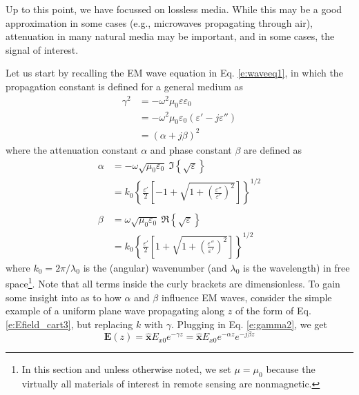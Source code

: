 \documentclass[11pt, oneside]{article}
\begin{document}
Up to this point, we have focussed on lossless media. While this may be a good approximation in some cases (e.g., microwaves propagating through air), attenuation in many natural media may be important, and in some cases, the signal of interest. 

Let us start by recalling the EM wave equation in Eq. \ref{e:waveeq1}, in which the propagation constant is defined for a general medium as
	\begin{subequations}
	\label{e:gamma2}
	\begin{align}
	\gamma^2 &= -\omega^2\mu_0\varepsilon\varepsilon_0 \\
			&= -\omega^2\mu_0\varepsilon_0(\varepsilon' - j\varepsilon'') \\
			&= (\alpha + j\beta)^2
	\end{align}
	\end{subequations}
where the attenuation constant $\alpha$ and phase constant $\beta$ are defined as 
	\begin{subequations}
	\label{e:alphabeta1}
	\begin{align}
	\alpha &= -\omega \sqrt{\mu_0\varepsilon_0}\ \Im{\left\{\sqrt{\varepsilon}\right\}} \nonumber \\
		&= k_0\left\{ \frac{\varepsilon'}{2}\left[-1 + \sqrt{1+\left(\frac{\varepsilon''}{\varepsilon'}\right)^2} \right]\right\}^{1/2} \label{e:alpha1} \\ \nonumber \\ 
	\beta &= \omega\sqrt{\mu_0\varepsilon_0}\ \Re{\left\{\sqrt{\varepsilon}\right\}} \nonumber \\
		&= k_0\left\{ \frac{\varepsilon'}{2}\left[1 + \sqrt{1+\left(\frac{\varepsilon''}{\varepsilon'}\right)^2} \right]\right\}^{1/2} \label{e:beta1}
	\end{align}
	\end{subequations}
where $k_0 = 2\pi/\lambda_0$ is the (angular) wavenumber (and $\lambda_0$ is the wavelength) in free space\footnote{In this section and unless otherwise noted, we set $\mu = \mu_0$ because the virtually all materials of interest in remote sensing are nonmagnetic.}. Note that all terms inside the curly brackets are dimensionless. To gain some insight into as to how $\alpha$ and $\beta$ influence EM waves, consider the simple example of a uniform plane wave propagating along $z$ of the form of Eq. \ref{e:Efield_cart3}, but replacing $k$ with $\gamma$. Plugging in Eq. \ref{e:gamma2}, we get
	\begin{equation}
	\label{e:wave_e_alphabeta}
	\mathbf{E}(z) = \hat{\mathbf{x}}E_{x0}e^{-\gamma z} = \hat{\mathbf{x}}E_{x0}e^{-\alpha z}e^{-j\beta z}
	\end{equation}
\end{document}
